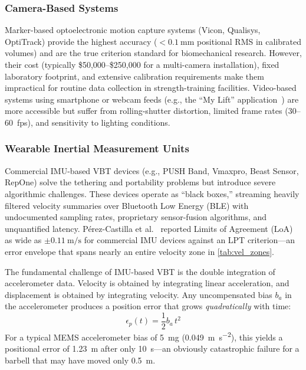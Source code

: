 \subsubsection{Camera-Based Systems}
Marker-based optoelectronic motion capture systems (Vicon, Qualisys, OptiTrack) provide the highest accuracy ($<\SI{0.1}{\milli\metre}$ positional RMS in calibrated volumes) and are the true criterion standard for biomechanical research.
However, their cost (typically \$50,000--\$250,000 for a multi-camera installation), fixed laboratory footprint, and extensive calibration requirements make them impractical for routine data collection in strength-training facilities.
Video-based systems using smartphone or webcam feeds (e.g., the ``My Lift'' application~\cite{balsalobre-fernandez2017}) are more accessible but suffer from rolling-shutter distortion, limited frame rates (\SI{30}{}--\SI{60}{fps}), and sensitivity to lighting conditions.

\subsubsection{Wearable Inertial Measurement Units}
Commercial IMU-based VBT devices (e.g., PUSH Band, Vmaxpro, Beast Sensor, RepOne) solve the tethering and portability problems but introduce severe algorithmic challenges.
These devices operate as ``black boxes,'' streaming heavily filtered velocity summaries over Bluetooth Low Energy (BLE) with undocumented sampling rates, proprietary sensor-fusion algorithms, and unquantified latency.
Pérez-Castilla et al.~\cite{perez-castilla2019} reported Limits of Agreement (LoA) as wide as $\pm\SI{0.11}{\metre\per\second}$ for commercial IMU devices against an LPT criterion---an error envelope that spans nearly an entire velocity zone in \cref{tab:vel_zones}.

The fundamental challenge of IMU-based VBT is the double integration of accelerometer data.
Velocity is obtained by integrating linear acceleration, and displacement is obtained by integrating velocity.
Any uncompensated bias $b_a$ in the accelerometer produces a position error that grows \emph{quadratically} with time:
\begin{equation}\label{eq:drift}
  \epsilon_p(t) = \frac{1}{2} b_a \, t^2
\end{equation}
For a typical MEMS accelerometer bias of \SI{5}{\milli\g} (\SI{0.049}{\metre\per\second\squared}), this yields a positional error of \SI{1.23}{\metre} after only \SI{10}{\second}---an obviously catastrophic failure for a barbell that may have moved only \SI{0.5}{\metre}.


